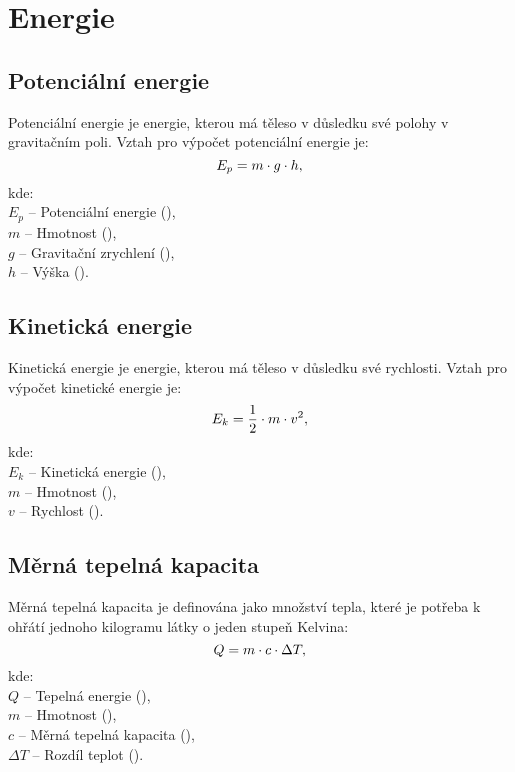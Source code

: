 \documentclass{article}
\begin{document}
\newpage



\section{Energie}


\subsection{Potenciální energie}
Potenciální energie je energie, kterou má těleso v důsledku své polohy v gravitačním poli. Vztah pro výpočet potenciální energie je:
\begin{equation}
    E_p = m \cdot g \cdot h,
    \tagaddtext{(\ueqJ)}
\end{equation}
kde:\\
$E_p$ -- Potenciální energie (\ueqJ),\\
$m$ -- Hmotnost (\ueqKG),\\
$g$ -- Gravitační zrychlení (\ueqMandSinvsq),\\
$h$ -- Výška (\ueqM).


\subsection{Kinetická energie}
Kinetická energie je energie, kterou má těleso v důsledku své rychlosti. Vztah pro výpočet kinetické energie je:
\begin{equation}
    E_k = \frac{1}{2} \cdot m \cdot v^2,
    \tagaddtext{(\ueqJ)}
\end{equation}
kde:\\
$E_k$ -- Kinetická energie (\ueqJ),\\
$m$ -- Hmotnost (\ueqKG),\\
$v$ -- Rychlost (\ueqMandSinv).


\subsection{Měrná tepelná kapacita}
Měrná tepelná kapacita je definována jako množství tepla, které je potřeba k ohřátí jednoho kilogramu látky o jeden stupeň Kelvina:
\begin{equation}
    Q = m \cdot c \cdot \Delta T,
    \tagaddtext{(\ueqJ)}
\end{equation}
kde:\\
$Q$ -- Tepelná energie (\ueqJ),\\
$m$ -- Hmotnost (\ueqKG),\\
$c$ -- Měrná tepelná kapacita (\ueqJandKGinvKinv),\\
$\Delta T$ -- Rozdíl teplot (\ueqK).
\end{document}
